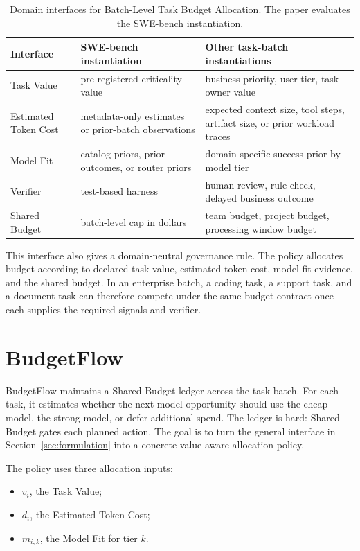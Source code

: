 \documentclass{article}
\newcommand{\method}{BudgetFlow\xspace}
\newcommand{\taskvalue}{Task Value\xspace}
\newcommand{\tokencost}{Estimated Token Cost\xspace}
\newcommand{\modelfit}{Model Fit\xspace}
\newcommand{\sharedbudget}{Shared Budget\xspace}
\newcommand{\verifier}{Verifier\xspace}
\begin{document}
\begin{table}[t]
\centering
\small
\begin{tabular}{p{}p{}p{}}
\toprule
Interface & SWE-bench instantiation & Other task-batch instantiations \\
\midrule
\taskvalue & pre-registered criticality value & business priority, user tier, task owner value \\
\tokencost & metadata-only estimates or prior-batch observations & expected context size, tool steps, artifact size, or prior workload traces \\
\modelfit & catalog priors, prior outcomes, or router priors & domain-specific success prior by model tier \\
\verifier & test-based harness & human review, rule check, delayed business outcome \\
\sharedbudget & batch-level cap in dollars & team budget, project budget, processing window budget \\
\bottomrule
\end{tabular}
\caption{Domain interfaces for Batch-Level Task Budget Allocation. The paper evaluates the SWE-bench instantiation.}
\label{tab:interfaces}
\vspace{0.6em}
\end{table}

This interface also gives a domain-neutral governance rule. The policy allocates budget according to declared task value, estimated token cost, model-fit evidence, and the shared budget. In an enterprise batch, a coding task, a support task, and a document task can therefore compete under the same budget contract once each supplies the required signals and verifier.

\section{BudgetFlow}
\label{sec:method}
\method maintains a \sharedbudget ledger across the task batch. For each task, it estimates whether the next model opportunity should use the cheap model, the strong model, or defer additional spend. The ledger is hard: \sharedbudget gates each planned action. The goal is to turn the general interface in Section~\ref{sec:formulation} into a concrete value-aware allocation policy.

The policy uses three allocation inputs:

\begin{itemize}
    \item $v_i$, the \taskvalue;
    \item $d_i$, the \tokencost;
    \item $m_{i,k}$, the \modelfit for tier $k$.
\end{itemize}
\end{document}
